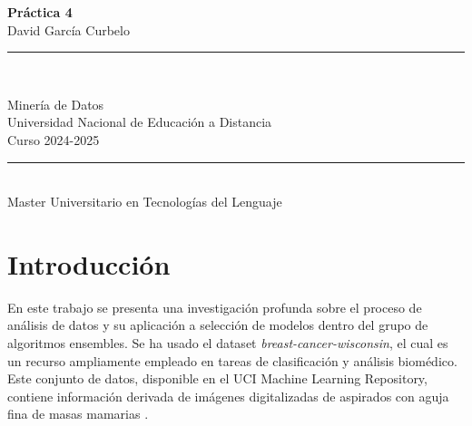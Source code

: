 \documentclass[a4paper,12pt]{article}
\begin{document}
\begin{titlepage}
    \centering
    \vspace*{1cm}

    {\Huge \textbf{Práctica 4}} \\[0.5cm]
    {\Large {David García Curbelo}}

    \vspace*{1cm}
    \rule{0.05\linewidth}{0.3mm} \\[0.4cm]
    \vspace*{1cm}

    \begin{large}
        Minería de Datos \\[0.2cm]
        Universidad Nacional de Educación a Distancia \\[0.5cm]
        Curso 2024-2025
    \end{large}

    \vfill

    \begin{minipage}{0.8\textwidth}
        \centering
        \vspace{0.5cm}
        \rule{0.9\linewidth}{0.3mm} \\[0.4cm]
        Master Universitario en Tecnologías del Lenguaje
    \end{minipage}
\end{titlepage}

\newpage
\tableofcontents
\newpage



\section{Introducción}

En este trabajo se presenta una investigación profunda sobre el proceso de análisis de datos y su aplicación a selección de modelos dentro del grupo de algoritmos ensembles. Se ha usado el dataset \textit{breast-cancer-wisconsin}, el cual es un recurso ampliamente empleado en tareas de clasificación y análisis biomédico. Este conjunto de datos, disponible en el UCI Machine Learning Repository, contiene información derivada de imágenes digitalizadas de aspirados con aguja fina de masas mamarias \cite{dataset}.
\end{document}
